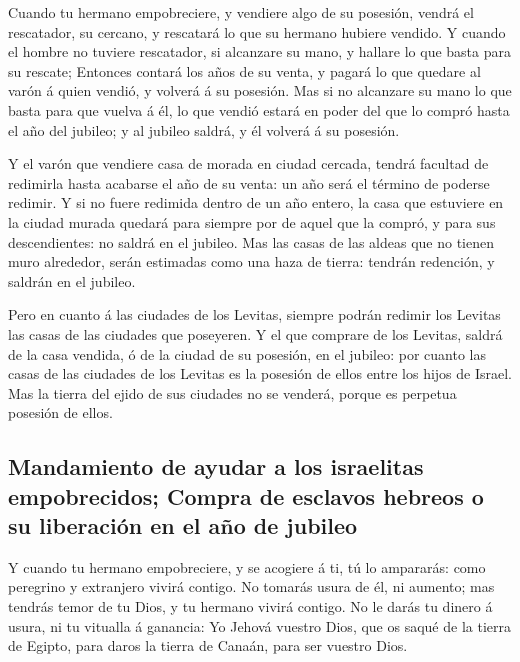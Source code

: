  Cuando tu hermano empobreciere, y vendiere algo de su
posesión, vendrá el rescatador, su cercano, y rescatará lo que su
hermano hubiere vendido.  Y cuando el hombre no tuviere
rescatador, si alcanzare su mano, y hallare lo que basta para su
rescate;  Entonces contará los años de su venta, y pagará
lo que quedare al varón á quien vendió, y volverá á su posesión.
 Mas si no alcanzare su mano lo que basta para que vuelva
á él, lo que vendió estará en poder del que lo compró hasta el año del
jubileo; y al jubileo saldrá, y él volverá á su posesión.

 Y el varón que vendiere casa de morada en ciudad
cercada, tendrá facultad de redimirla hasta acabarse el año de su venta:
un año será el término de poderse redimir.  Y si no fuere
redimida dentro de un año entero, la casa que estuviere en la ciudad
murada quedará para siempre por de aquel que la compró, y para sus
descendientes: no saldrá en el jubileo.  Mas las casas de
las aldeas que no tienen muro alrededor, serán estimadas como una haza
de tierra: tendrán redención, y saldrán en el jubileo.

 Pero en cuanto á las ciudades de los Levitas, siempre
podrán redimir los Levitas las casas de las ciudades que poseyeren.
 Y el que comprare de los Levitas, saldrá de la casa
vendida, ó de la ciudad de su posesión, en el jubileo: por cuanto las
casas de las ciudades de los Levitas es la posesión de ellos entre los
hijos de Israel.  Mas la tierra del ejido de sus ciudades
no se venderá, porque es perpetua posesión de ellos.

\hypertarget{mandamiento-de-ayudar-a-los-israelitas-empobrecidos-compra-de-esclavos-hebreos-o-su-liberaciuxf3n-en-el-auxf1o-de-jubileo}{%
\subsection{Mandamiento de ayudar a los israelitas empobrecidos; Compra
de esclavos hebreos o su liberación en el año de
jubileo}\label{mandamiento-de-ayudar-a-los-israelitas-empobrecidos-compra-de-esclavos-hebreos-o-su-liberaciuxf3n-en-el-auxf1o-de-jubileo}}

 Y cuando tu hermano empobreciere, y se acogiere á ti, tú
lo ampararás: como peregrino y extranjero vivirá contigo.
 No tomarás usura de él, ni aumento; mas tendrás temor de
tu Dios, y tu hermano vivirá contigo.  No le darás tu
dinero á usura, ni tu vitualla á ganancia:  Yo Jehová
vuestro Dios, que os saqué de la tierra de Egipto, para daros la tierra
de Canaán, para ser vuestro Dios.

